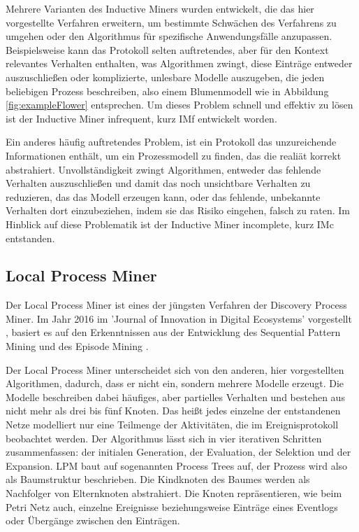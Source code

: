Mehrere Varianten des Inductive Miners wurden entwickelt, die das hier vorgestellte Verfahren erweitern, um bestimmte Schwächen des Verfahrens zu umgehen oder den Algorithmus für spezifische Anwendungsfälle anzupassen. 
Beispielsweise kann das Protokoll selten auftretendes, aber für den Kontext relevantes Verhalten enthalten, was Algorithmen zwingt, diese Einträge entweder auszuschließen oder komplizierte, unlesbare Modelle auszugeben, die jeden beliebigen Prozess beschreiben, also einem  Blumenmodell wie in Abbildung \ref{fig:exampleFlower} entsprechen. Um dieses Problem schnell und effektiv zu lösen ist der Inductive Miner infrequent, kurz IMf \cite{inducFMining} entwickelt worden.

Ein anderes häufig auftretendes Problem, ist ein Protokoll das unzureichende Informationen enthält, um ein Prozessmodell zu finden, das die realiät korrekt abstrahiert. Unvollständigkeit zwingt Algorithmen, entweder das fehlende Verhalten auszuschließen und damit das noch unsichtbare Verhalten zu reduzieren, das das Modell erzeugen kann, oder das fehlende, unbekannte Verhalten dort einzubeziehen, indem sie das Risiko eingehen, falsch zu raten. Im Hinblick auf diese Problematik ist der Inductive Miner incomplete, kurz IMc \cite{inducIMining} entstanden.

\subsection{Local Process Miner}
Der Local Process Miner ist eines der jüngsten Verfahren der Discovery Process Miner. Im Jahr 2016 im 'Journal of Innovation in Digital Ecosystems' vorgestellt \cite{localMining}, basiert es auf den Erkenntnissen aus der Entwicklung des Sequential Pattern Mining \cite{Srikant1996MiningSP} und des Episode Mining \cite{mannila1997discovery}.

Der Local Process Miner unterscheidet sich von den anderen, hier vorgestellten Algorithmen, dadurch, dass er nicht ein, sondern mehrere Modelle erzeugt. Die Modelle beschreiben dabei häufiges, aber partielles Verhalten und bestehen  aus nicht mehr als drei bis fünf Knoten. Das heißt jedes einzelne der entstandenen Netze modelliert nur eine Teilmenge der Aktivitäten, die im Ereignisprotokoll beobachtet werden. Der Algorithmus lässt sich in vier iterativen Schritten zusammenfassen: der initialen Generation, der Evaluation, der Selektion und der Expansion. LPM baut auf sogenannten Process Trees auf, der Prozess wird also als Baumstruktur beschrieben. Die  Kindknoten des Baumes werden als Nachfolger von Elternknoten abstrahiert. Die Knoten repräsentieren, wie beim Petri Netz auch, einzelne Ereignisse beziehungsweise Einträge eines Eventlogs oder Übergänge zwischen den Einträgen. 

